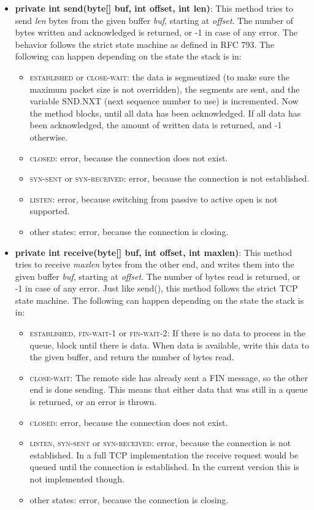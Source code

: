 \documentclass{hitec}
\newcommand{\state}[1]{\textsc{#1}}
\begin{document}
\begin{itemize}
 \item \textbf{private int send(byte[] buf, int offset, int len)}: This method tries to send \emph{len} bytes from the given buffer \emph{buf}, starting at \emph{offset}. The number of bytes written and acknowledged is returned, or -1 in case of any error. The behavior follows the strict state machine as defined in RFC 793. The following can happen depending on the state the stack is in: 
 
  \begin{itemize}
    \item \state{established} or \state{close-wait}: the data is segmentized (to make sure the maximum packet size is not overridden), the segments are sent, and the variable SND.NXT (next sequence number to use) is incremented. Now the method blocks, until all data has been acknowledged. If all data has been acknowledged, the amount of written data is returned, and -1 otherwise.
    \item \state{closed}: error, because the connection does not exist.
    \item \state{syn-sent} or \state{syn-received}: error, because the connection is not established.
    \item \state{listen}: error, because switching from passive to active open is not supported.
    \item other states: error, because the connection is closing.
  \end{itemize}
  
  \item \textbf{private int receive(byte[] buf, int offset, int maxlen)}: This method tries to receive \emph{maxlen} bytes from the other end, and writes them into the given buffer \emph{buf}, starting at \emph{offset}. The number of bytes read is returned, or -1 in case of any error. Just like send(), this method follows the strict TCP state machine. The following can happen depending on the state the stack is in:
  
  \begin{itemize}
    \item \state{established}, \state{fin-wait-1} or \state{fin-wait-2}: If there is no data to process in the queue, block until there is data. When data is available, write this data to the given buffer, and return the number of bytes read.
    \item \state{close-wait}: The remote side has already sent a FIN message, so the other end is done sending. This means that either data that was still in a queue is returned, or an error is thrown.
    \item \state{closed}: error, because the connection does not exist.
    \item \state{listen}, \state{syn-sent} or \state{syn-received}: error, because the connection is not established. In a full TCP implementation the receive request would be queued until the connection is established. In the current version this is not implemented though.
    \item other states: error, because the connection is closing.
  \end{itemize}
 

\end{itemize}
\end{document}
